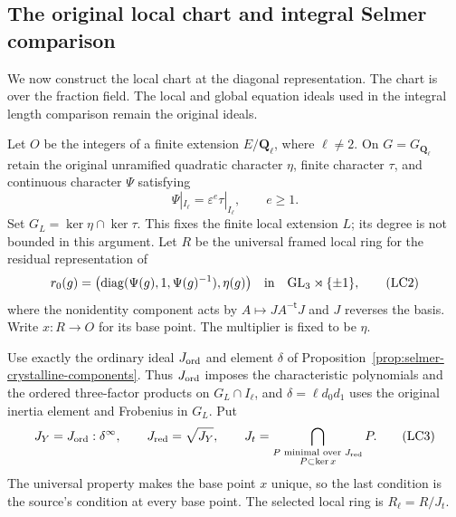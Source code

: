 \subsection{The original local chart and integral Selmer comparison}
\label{sec:support-local-chart}

We now construct the local chart at the diagonal representation.  The
chart is over the fraction field.  The local and global equation ideals
used in the integral length comparison remain the original ideals.

Let $O$ be the integers of a finite extension $E/\mathbf Q_\ell$,
where $\ell\ne2$.  On $G=G_{\mathbf Q_\ell}$ retain the original
unramified quadratic character $\eta$, finite character $\tau$, and
continuous character $\Psi$ satisfying
\[
 \Psi|_{I_\ell}=\varepsilon^e\tau|_{I_\ell},\qquad e\ge1.
                                                               \tag{LC1}
\]
Set $G_L=\ker\eta\cap\ker\tau$.  This fixes the finite local
extension $L$; its degree is not bounded in this argument.  Let $R$ be
the universal framed local ring for the residual representation of
\[
 r_0(g)=\bigl(\operatorname{diag}(\Psi(g),1,\Psi(g)^{-1}),
                    \eta(g)\bigr)
 \quad\hbox{in}\quad
 \mathrm{GL}_3\rtimes\{\pm1\},
                                                               \tag{LC2}
\]
where the nonidentity component acts by $A\mapsto JA^{-\mathsf t}J$
and $J$ reverses the basis.  Write $x:R\to O$ for its base point.
The multiplier is fixed to be $\eta$.

Use exactly the ordinary ideal $J_{\rm ord}$ and element $\delta$
of Proposition~\ref{prop:selmer-crystalline-components}.  Thus
$J_{\rm ord}$ imposes the characteristic polynomials and the ordered
three-factor products on $G_L\cap I_\ell$, and
$\delta=\ell d_0d_1$ uses the original inertia element and Frobenius
in $G_L$.  Put
\[
 J_Y=J_{\rm ord}:\delta^\infty,\qquad
 J_{\rm red}=\sqrt{J_Y},\qquad
 J_t=\bigcap_{\substack{P\text{ minimal over }J_{\rm red}\\
                               P\subset\ker x}}P.
                                                               \tag{LC3}
\]
The universal property makes the base point $x$ unique, so the last
condition is the source's condition at every base point.  The selected
local ring is $R_\ell=R/J_t$.

